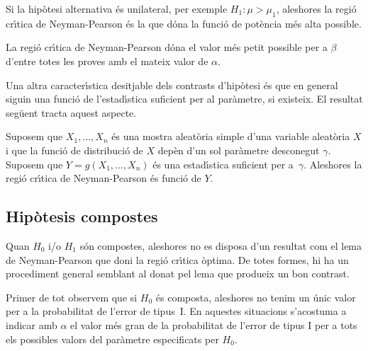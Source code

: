 Si la hip\`otesi alternativa \'es unilateral,
per exemple $H_1: \mu > \mu_1$, aleshores la regi\'o cr\'{\i}tica de 
Neyman-Pearson \'es la que d\'ona la funci\'o de
pot\`encia m\'es alta possible.

La regi\'o cr\'{\i}tica de Neyman-Pearson d\'ona el valor m\'es petit 
possible per a $\beta$ d'entre totes les proves amb el mateix valor de $\alpha$.

Una altra caracter\'{\i}stica desitjable dels contrasts d'hip\`otesi \'es 
que en general siguin una funci\'o de l'estad\'{\i}stica suficient
 per al par\`ametre,
 si existeix. El
resultat seg\"uent tracta aquest aspecte.

\begin{proposition}
Suposem que $X_1, \ldots , X_n$ \'es una mostra aleat\`oria simple
d'una variable aleat\`oria $X$ i que la funci\'o de distribuci\'o de $X$ dep\`en d'un
sol par\`ametre 
desconegut $\gamma$. Suposem que $Y = g(X_1, \ldots , X_n)$ \'es una
estad\'{\i}stica suficient
 per a~$\gamma$. 
Aleshores la regi\'o cr\'{\i}tica de Neyman-Pearson \'es funci\'o de $Y$.
\end{proposition}

\subsection{Hip\`otesis compostes}

Quan $H_0$ i/o $H_1$ s\'on compostes, aleshores no es disposa d'un resultat 
com el lema de Neyman-Pearson
 que doni la regi\'o cr\'{\i}tica \`optima. 
De totes formes, hi ha
un procediment general semblant al donat pel lema que produeix un bon contrast.

Primer de tot observem que si $H_0$ \'es composta, aleshores no tenim un \'unic
valor per a la probabilitat de l'error de tipus~I. 
En aquestes situacions
s'acostuma a indicar amb $\alpha$ el valor m\'es gran de la probabilitat de
l'error de tipus I per a tots els possibles valors del par\`ametre especificats
per $H_0$.

